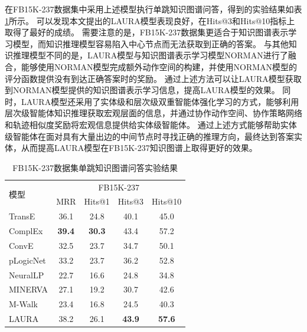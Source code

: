 \documentclass[algorithmlist, AutoFakeBold, AutoFakeSlant, figurelist, tablelist, nomlist, engineering]{seuthesix}
\begin{document}
在FB15K-237数据集中采用上述模型执行单跳知识图谱问答，得到的实验结果如表\ref{Experiment2_FB15K-237}所示。
可以发现本文提出的LAURA模型表现良好，在Hits@3和Hits@10指标上取得了最好的成绩。
需要注意的是，FB15K-237数据集更适合于知识图谱表示学习模型，而知识推理模型容易陷入中心节点而无法获取到正确的答案。
与其他知识推理模型不同的是，LAURA模型与知识图谱表示学习模型NORMAN进行了融合，能够使用NORMAN模型完成额外动作空间的构建，并使用NORMAN模型的评分函数提供没有到达正确答案时的奖励。
通过上述方法可以让LAURA模型获取到NORMAN模型提供的知识图谱表示学习信息，提高LAURA模型的效果。
同时，LAURA模型还采用了实体级和层次级双重智能体强化学习的方式，能够利用层次级智能体知识推理获取宏观层面的信息，并通过协作动作空间、协作策略网络和轨迹相似度奖励将宏观信息提供给实体级智能体。
通过上述方式能够帮助实体级智能体在面对具有大量出边的中间节点时寻找正确的推理方向，最终达到答案实体，从而提高LAURA模型在FB15K-237知识图谱上取得更好的效果。
\begin{table}[]
  \centering
  \begin{tabular*}{0.95\textwidth}{@{\extracolsep{\fill}}lcccc}
  \toprule[1pt]
  \multirow{2}{*}{模型} & \multicolumn{4}{c}{FB15K-237}   \\
    & MRR & Hits@1 & Hits@3 & Hits@10 \\ \hline
  TransE & 36.1 & 24.8 & 40.1 & 45.0 \\
  ComplEx & \textbf{39.4} & \textbf{30.3} & 43.4 & 57.2 \\
  ConvE & 32.5 & 23.7 & 34.7 & 50.1 \\
  pLogicNet & 33.2 & 23.7 & 36.2 & 52.8 \\
  NeuralLP & 22.7 & 16.6 & 24.8 & 34.8 \\
  MINERVA & 27.1 & 19.2 & 30.7 & 42.6 \\
  M-Walk & 23.4 & 16.8 & 24.5 & 40.3 \\
  LAURA & 38.2 & 26.1 & \textbf{43.9} & \textbf{57.6} \\
  \bottomrule[1pt]
  \end{tabular*}
  \caption{FB15K-237数据集单跳知识图谱问答实验结果}
  \label{Experiment2_FB15K-237}
\end{table}
\end{document}
